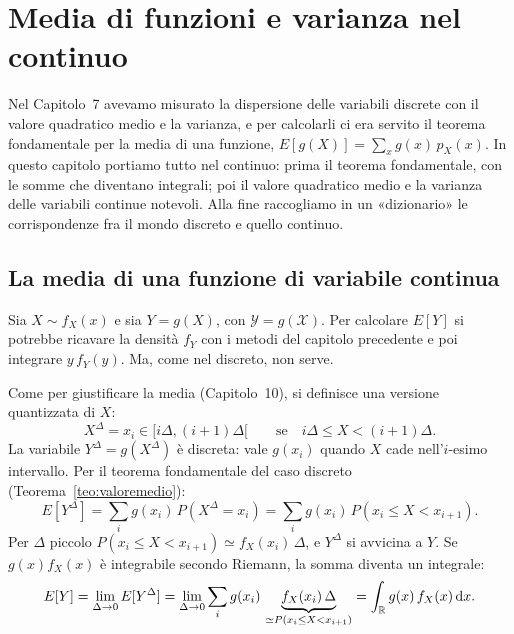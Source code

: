 \chapter{Media di funzioni e varianza nel continuo}

Nel Capitolo~7 avevamo misurato la dispersione delle variabili discrete con il valore quadratico medio e la varianza,
e per calcolarli ci era servito il teorema fondamentale per la media di una funzione, $E[g(X)] = \sum_x g(x)\,
p_X(x)$. In questo capitolo portiamo tutto nel continuo: prima il teorema fondamentale, con le somme che diventano
integrali; poi il valore quadratico medio e la varianza delle variabili continue notevoli. Alla fine raccogliamo in un
«dizionario» le corrispondenze fra il mondo discreto e quello continuo.

\section{La media di una funzione di variabile continua}

Sia $X \sim f_X(x)$ e sia $Y = g(X)$, con $\mathcal{Y} = g(\mathcal{X})$. Per calcolare $E[Y]$ si potrebbe ricavare la
densità $f_Y$ con i metodi del capitolo precedente e poi integrare $y\, f_Y(y)$. Ma, come nel discreto, non serve.


\begin{dimostrazione}
 Come per giustificare la media (Capitolo~10), si definisce una versione quantizzata di $X$:
\[ X^{\Delta} = x_i \in [i\Delta, (i+1)\Delta[ \qquad \text{se} \quad i\Delta \leq X < (i+1)\Delta . \]
 La variabile $Y^{\Delta} = g(X^{\Delta})$ è discreta: vale $g(x_i)$ quando $X$ cade
nell'$i$-esimo intervallo. Per il teorema fondamentale del caso discreto (Teorema~\ref{teo:valoremedio}):
\[ E[Y^{\Delta}] = \sum_i g(x_i)\, P(X^{\Delta} = x_i) = \sum_i g(x_i)\, P(x_i \leq X < x_{i+1}) . \]
 Per $\Delta$ piccolo $P(x_i \leq X < x_{i+1}) \simeq f_X(x_i)\,\Delta$, e
$Y^{\Delta}$ si avvicina a $Y$. Se $g(x) f_X(x)$ è integrabile secondo Riemann, la somma diventa un integrale:
\[ E[Y] = \lim_{\Delta \to 0} E[Y^{\Delta}] = \lim_{\Delta \to 0} \sum_i g(x_i)\, \underbrace{f_X(x_i)\,\Delta}_{\simeq
   P(x_i \leq X < x_{i+1})} = \int_{\mathbb{R}} g(x)\, f_X(x) \,\mathrm{d} x . \]
\end{dimostrazione}

